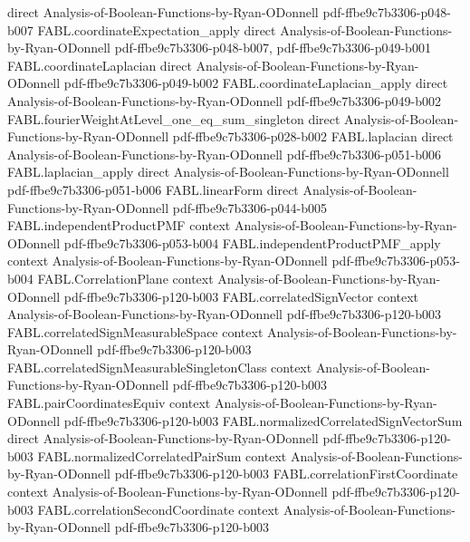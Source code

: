 \begin{theorem}
  {direct}
  {Analysis-of-Boolean-Functions-by-Ryan-ODonnell}
  {pdf-ffbe9c7b3306-p048-b007}
\proofstep
  {FABL.coordinateExpectation_apply}
  {direct}
  {Analysis-of-Boolean-Functions-by-Ryan-ODonnell}
  {pdf-ffbe9c7b3306-p048-b007,
    pdf-ffbe9c7b3306-p049-b001}
\proofstep
  {FABL.coordinateLaplacian}
  {direct}
  {Analysis-of-Boolean-Functions-by-Ryan-ODonnell}
  {pdf-ffbe9c7b3306-p049-b002}
\proofstep
  {FABL.coordinateLaplacian_apply}
  {direct}
  {Analysis-of-Boolean-Functions-by-Ryan-ODonnell}
  {pdf-ffbe9c7b3306-p049-b002}
\proofstep
  {FABL.fourierWeightAtLevel_one_eq_sum_singleton}
  {direct}
  {Analysis-of-Boolean-Functions-by-Ryan-ODonnell}
  {pdf-ffbe9c7b3306-p028-b002}
\proofstep
  {FABL.laplacian}
  {direct}
  {Analysis-of-Boolean-Functions-by-Ryan-ODonnell}
  {pdf-ffbe9c7b3306-p051-b006}
\proofstep
  {FABL.laplacian_apply}
  {direct}
  {Analysis-of-Boolean-Functions-by-Ryan-ODonnell}
  {pdf-ffbe9c7b3306-p051-b006}
\proofstep
  {FABL.linearForm}
  {direct}
  {Analysis-of-Boolean-Functions-by-Ryan-ODonnell}
  {pdf-ffbe9c7b3306-p044-b005}
\proofstep
  {FABL.independentProductPMF}
  {context}
  {Analysis-of-Boolean-Functions-by-Ryan-ODonnell}
  {pdf-ffbe9c7b3306-p053-b004}
\proofstep
  {FABL.independentProductPMF_apply}
  {context}
  {Analysis-of-Boolean-Functions-by-Ryan-ODonnell}
  {pdf-ffbe9c7b3306-p053-b004}
\proofstep
  {FABL.CorrelationPlane}
  {context}
  {Analysis-of-Boolean-Functions-by-Ryan-ODonnell}
  {pdf-ffbe9c7b3306-p120-b003}
\proofstep
  {FABL.correlatedSignVector}
  {context}
  {Analysis-of-Boolean-Functions-by-Ryan-ODonnell}
  {pdf-ffbe9c7b3306-p120-b003}
\proofstep
  {FABL.correlatedSignMeasurableSpace}
  {context}
  {Analysis-of-Boolean-Functions-by-Ryan-ODonnell}
  {pdf-ffbe9c7b3306-p120-b003}
\proofstep
  {FABL.correlatedSignMeasurableSingletonClass}
  {context}
  {Analysis-of-Boolean-Functions-by-Ryan-ODonnell}
  {pdf-ffbe9c7b3306-p120-b003}
\proofstep
  {FABL.pairCoordinatesEquiv}
  {context}
  {Analysis-of-Boolean-Functions-by-Ryan-ODonnell}
  {pdf-ffbe9c7b3306-p120-b003}
\proofstep
  {FABL.normalizedCorrelatedSignVectorSum}
  {direct}
  {Analysis-of-Boolean-Functions-by-Ryan-ODonnell}
  {pdf-ffbe9c7b3306-p120-b003}
\proofstep
  {FABL.normalizedCorrelatedPairSum}
  {context}
  {Analysis-of-Boolean-Functions-by-Ryan-ODonnell}
  {pdf-ffbe9c7b3306-p120-b003}
\proofstep
  {FABL.correlationFirstCoordinate}
  {context}
  {Analysis-of-Boolean-Functions-by-Ryan-ODonnell}
  {pdf-ffbe9c7b3306-p120-b003}
\proofstep
  {FABL.correlationSecondCoordinate}
  {context}
  {Analysis-of-Boolean-Functions-by-Ryan-ODonnell}
  {pdf-ffbe9c7b3306-p120-b003}

\end{theorem}
